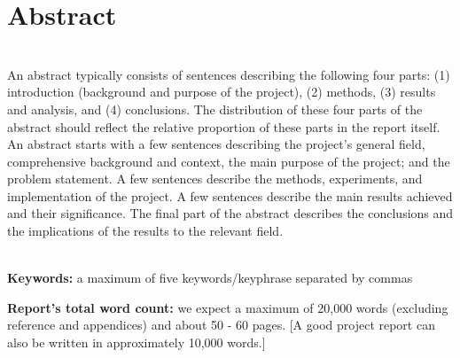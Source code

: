 \chapter*{\center \Large  Abstract}



~\\[1cm]%
 An abstract typically consists of sentences describing the following four parts: (1) introduction (background and purpose of the project), (2) methods, (3) results and analysis, and (4) conclusions. The distribution of these four parts of the abstract should reflect the relative proportion of these parts in the report itself. An abstract starts with a few sentences describing the project's general field, comprehensive background and context, the main purpose of the project; and the problem statement. A few sentences describe the methods, experiments, and implementation of the project. A few sentences describe the main results achieved and their significance. The final part of the abstract describes the conclusions and the implications of the results to the relevant field.


~\\[1cm]
\noindent %
\textbf{Keywords:} a maximum of five keywords/keyphrase separated by commas

\vfill
\noindent
\textbf{Report's total word count:} we expect a maximum of 20,000 words (excluding reference and appendices) and about 50 - 60 pages. [A good project report can also be written in approximately 10,000 words.]

